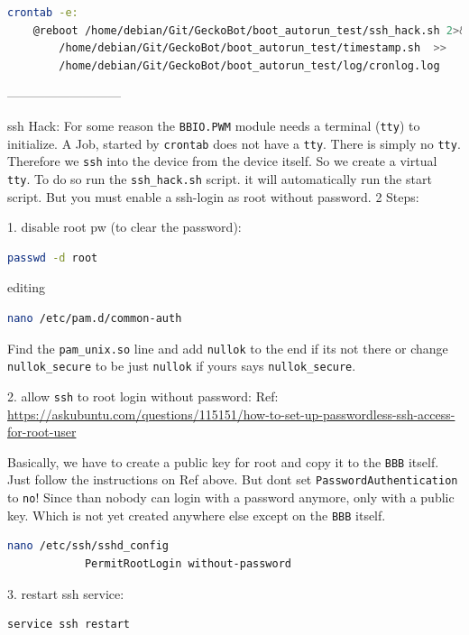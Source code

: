 \documentclass[
	fontsize=10pt
	paper=a4
]{scrartcl}
\begin{document}
\begin{lstlisting}[language=bash]
crontab -e:
    @reboot /home/debian/Git/GeckoBot/boot_autorun_test/ssh_hack.sh 2>&1 |
        /home/debian/Git/GeckoBot/boot_autorun_test/timestamp.sh  >>
        /home/debian/Git/GeckoBot/boot_autorun_test/log/cronlog.log
\end{lstlisting}

---------------------------

ssh Hack:
For some reason the \texttt{BBIO.PWM} module needs a terminal (\texttt{tty}) to initialize.
A Job, started by \texttt{crontab} does not have a \texttt{tty}. There is simply no \texttt{tty}.
Therefore we \texttt{ssh} into the device from the device itself. So we create a virtual \texttt{tty}.
To do so run the \texttt{ssh\_hack.sh} script. it will automatically run the start
script.
But you must enable a ssh-login as root without password. 2 Steps:

1. disable root pw (to clear the password):
\begin{lstlisting}[language=bash]
passwd -d root
\end{lstlisting}
            
editing
\begin{lstlisting}[language=bash]
nano /etc/pam.d/common-auth
\end{lstlisting}
Find the \texttt{pam\_unix.so} line and add \texttt{nullok} to the end if its
not there or change \texttt{nullok\_secure} to be just \texttt{nullok} if
yours says \texttt{nullok\_secure}.

2. allow \texttt{ssh} to root login without password:
Ref: \url{https://askubuntu.com/questions/115151/how-to-set-up-passwordless-ssh-access-for-root-user}

Basically, we have to create a public key for root and copy it
to the \texttt{BBB} itself. Just follow the instructions on Ref above.
But dont set \texttt{PasswordAuthentication} to \texttt{no}! 
Since than nobody can login with a password anymore, only with a public key. Which is not yet created anywhere else except on the \texttt{BBB} itself.

\begin{lstlisting}[language=bash]
        nano /etc/ssh/sshd_config
            PermitRootLogin without-password
\end{lstlisting}

3. restart ssh service:
\begin{lstlisting}[language=bash]
service ssh restart
\end{lstlisting}
\end{document}

